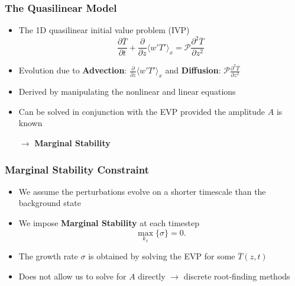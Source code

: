 \begin{frame}[fragile]
    \frametitle{The Quasilinear Model}
    \begin{itemize}
        \item The 1D quasilinear initial value problem (IVP)
        \begin{equation}
            \frac{\partial \overline{T}}{\partial t} + \frac{\partial}{\partial z} \langle w'T' \rangle_x = \mathcal{P} \frac{\partial^2 \overline{T}}{\partial z^2} \label{EQ:T0_IVP}
        \end{equation}
        \item Evolution due to \textbf{Advection}: $\frac{\partial}{\partial z} \langle w'T' \rangle_x $
        and \textbf{Diffusion}: $\mathcal{P} \frac{\partial^2 \overline{T}}{\partial z^2}$\newline

        \item Derived by manipulating the nonlinear and linear equations\newline
        
        \item Can be solved in conjunction with the EVP provided the amplitude $A$ is known\newline
        
        \hspace{0.5cm} $\mathbf{\longrightarrow}$ \textbf{Marginal Stability}

    \end{itemize}
    
    
\end{frame}

\begin{frame}[fragile]
    \frametitle{Marginal Stability Constraint}
    \begin{itemize}
        \item We assume the perturbations evolve on a shorter timescale than the background state\newline
        
        \item We impose \textbf{Marginal Stability} at each timestep
        \begin{equation}
            \max_{k_x} \{ \sigma \} = 0.
        \end{equation}\newline

        \item The growth rate $\sigma$ is obtained by solving the EVP for some $\overline{T}(z,t)$\newline
        
        \item Does not allow us to solve for $A$ directly $\longrightarrow$ discrete root-finding methods
    \end{itemize}
    
\end{frame}

